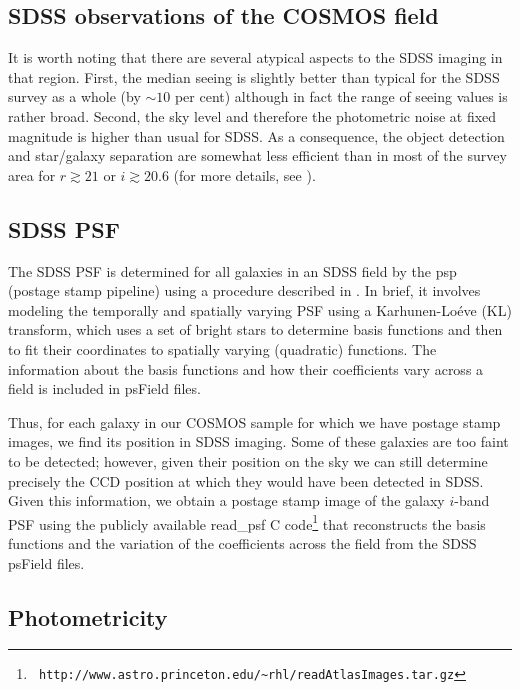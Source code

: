 \documentclass[twocolumn,useAMS,usenatbib]{mn2e}
\begin{document}
\subsection{SDSS observations of the COSMOS field}\label{SS:sdssobscosmos}

It is worth noting that there are several atypical aspects to
the SDSS imaging in that region.  First, the median seeing is slightly
better than typical for the SDSS survey as a whole (by $\sim 10$ per
cent) although in fact the range of seeing values is rather broad.
Second, the sky level and therefore the photometric noise at fixed
magnitude is higher than usual for SDSS.  As a consequence, the object
detection and star/galaxy separation are somewhat less efficient than
in most of the survey area for $r\gtrsim 21$ or
$i\gtrsim 20.6$ (for more details, see \citealt{2011arXiv1107.1395N}).


\subsection{SDSS PSF}

The SDSS PSF is determined for all galaxies in an SDSS field by the
{\sc psp} (postage stamp pipeline) using a
procedure described in \cite{2001ASPC..238..269L}.  In brief, it
involves modeling the temporally and spatially varying PSF using a
Karhunen-Lo\'eve (KL) transform, which uses a set of bright stars to
determine basis functions and then to fit their coordinates to
spatially varying (quadratic) functions.  The information about the basis
functions and how their coefficients vary across a field is included
in psField files. 

Thus, for each galaxy in our COSMOS sample for which we have postage
stamp images, we find its position in SDSS imaging.  Some of these
galaxies are too faint to be detected; however, given their position
on the sky we can still determine precisely the CCD position at which
they would have been detected in SDSS.  Given this information, 
we obtain a postage stamp image of the galaxy $i$-band PSF using the
publicly available {\sc read\_psf} C code\footnote{\tt
  http://www.astro.princeton.edu/\~{}rhl/readAtlasImages.tar.gz} that
reconstructs the basis functions and the variation of the
coefficients across the field from the SDSS psField files.

\subsection{Photometricity}\label{SSS:photometricity}
\end{document}
